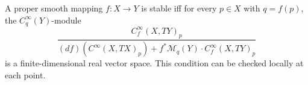 A proper smooth mapping $f: X \to Y$ is stable iff for every $p \in X$ with $q = f(p)$, the $C_q^\infty(Y)$-module
$$\frac{C_f^\infty(X, TY)_p}{(df)(C^\infty(X, TX)_p) + f^*\mathcal{M}_q(Y) \cdot C_f^\infty(X, TY)_p}$$
is a finite-dimensional real vector space. This condition can be checked locally at each point.
